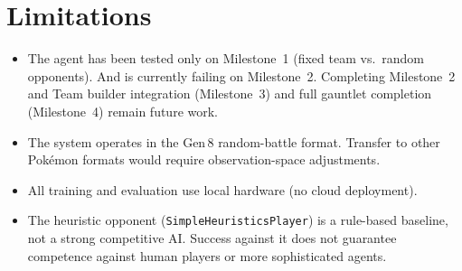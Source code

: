 \section{Limitations}

\begin{itemize}
  \item The agent has been tested only on Milestone~1 (fixed team vs.\ random
        opponents). And is currently failing on Milestone~2. Completing Milestone~2 and Team builder integration (Milestone~3) and full gauntlet
        completion (Milestone~4) remain future work.
  \item The system operates in the Gen\,8 random-battle format.  Transfer to
        other Pok\'{e}mon formats would require observation-space
        adjustments.
  \item All training and evaluation use local hardware (no cloud deployment).
  \item The heuristic opponent (\texttt{SimpleHeuristicsPlayer}) is a
        rule-based baseline, not a strong competitive AI.  Success against it
        does not guarantee competence against human players or more
        sophisticated agents.
\end{itemize}
